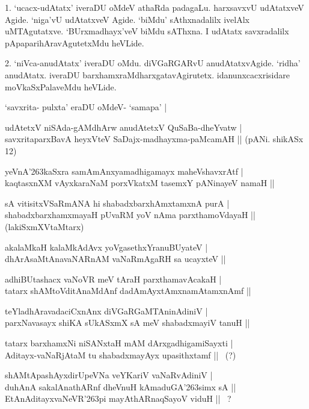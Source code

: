 \begin{artha}
1. `ucacx-udAtatx' iveraDU oMdeV athaRda padagaLu. harxsavxvU udAtatxveV Agide. `niga'vU udAtatxveV Agide. `biMdu' sAthxnadalilx ivelAlx uMTAgutatxve. `BUrxmadhayx'veV biMdu sAThxna. I udAtatx savxradalilx pApaparihAravAgutetxMdu heVLide.
\end{artha}

\begin{artha}
2. `niVca-anudAtatx' iveraDU oMdu. diVGaRGARvU anudAtatxvAgide. `ridha' anudAtatx. iveraDU barxhamxraMdharxgatavAgirutetx. idanunxcacxrisidare moVkaSxPalaveMdu heVLide.
\end{artha}

\begin{itemize}
{\bf 
 \item[3.] `savxrita- pulxta' eraDU oMdeV- `samapa' |
 \item[4.] udAtetxV niSAda-gAMdhArw anudAtetxV QuSaBa-dheYvatw |\\\label{156}
 savxritaparxBavA heyxVteV SaDajx-madhayxma-paMcamAH ||
 \hfill{(pANi. shikASx 12)}
 \item[5.] yeVnA\char'263kaSxra samAmAnxyamadhigamayx maheVshavxrAtf |\\\label{157}
 kaqtasxnXM vAyxkaraNaM porxVkatxM tasemxY pANinayeV namaH ||
 \item[6.] sA vitisitxVSaRmANA hi shabadxbarxhAmxtamxnA purA |\\\label{157a}
 shabadxbarxhamxmayaH pUvaRM yoV nAma parxthamoVdayaH ||\hfill{(lakiSxmXVtaMtarx)}
 \item[7.] akalaMkaH kalaMkAdAvx yoVgasethxYranuBUyateV |\\\label{157b}
 dhArAsaMtAnavaNARnAM vaNaRmAgaRH sa ucayxteV ||
 \item[8.] adhiBUtashacx vaNoVR meV tAraH parxthamavAcakaH |\\\label{157c}
 tatarx shAMtoVditAnaMdAnf dadAmAyxtAmxnamAtamxnAmf ||
 \item[9.] teYladhAravadaciCxnAnx diVGaRGaMTAninAdiniV |\\
 parxNavasayx shiKA sUkASxmX sA meV shabadxmayiV tanuH ||
 \item[10.] tatarx barxhamxNi niSANxtaH mAM dArxgadhigamiSayxti |\\
 Aditayx-vaNaRjAtaM tu shabadxmayAyx upasithxtamf || ~(?)
 \item[11.] shAMtApashAyxdirUpeVNa veYKariV vaNaRvAdiniV |\\
 duhAnA sakalAnathARnf dheVnuH kAmaduGA\char'263simx sA ||\\
 EtAnAditayxvaNeVR\char'263pi mayAthARnaqSayoV viduH || ~?}
\end{itemize}

